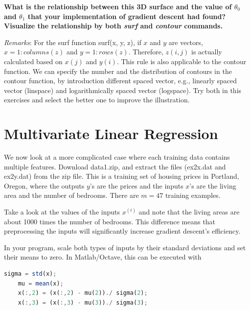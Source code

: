 \documentclass[10pt,a4paper]{article}
\begin{document}
  \textbf{What is the relationship between this 3D surface and the value of $\theta_0$ and $\theta_1$ that your implementation of gradient descent had found? Visualize the relationship by both \emph{surf} and \emph{contour} commands.}

  \vspace{2ex}
  \noindent\emph{Remarks}: For the \textsf{surf} function \textsf{surf(x, y, z)}, if $x$ and $y$ are vectors, $x = 1:columns(z)$ and $y=1:rows(z)$. Therefore, $z(i, j)$ is actually calculated based on $x(j)$ and $y(i)$. This rule is also applicable to the contour function. We can specify the number and the distribution of contours in the \textsf{contour} function, by introduction different spaced vector, e.g., linearly spaced vector (\textsf{linspace}) and logarithmically spaced vector (\textsf{logspace}). Try both in this exercises and select the better one to improve the illustration. 



\section{Multivariate Linear Regression}
%
  We now look at a more complicated case where each training data contains multiple features. Download data1.zip, and extract the files (ex2x.dat and ex2y.dat) from the zip file. This is a training set of housing prices in Portland, Oregon, where the outputs $y$'s are the prices and the inputs $x$'s are the living area and the number of bedrooms. There are $m=47$ training examples.

  Take a look at the values of the inputs $x^{(i)}$ and note that the living areas are about 1000 times the number of bedrooms. This difference means that preprocessing the inputs will significantly increase gradient descent's efficiency.

  In your program, scale both types of inputs by their standard deviations and set their means to zero. In Matlab/Octave, this can be executed with
  \begin{lstlisting}[language=Octave, basicstyle=\footnotesize, showspaces=false]
    sigma = std(x);
    mu = mean(x);
    x(:,2) = (x(:,2) - mu(2))./ sigma(2);
    x(:,3) = (x(:,3) - mu(3))./ sigma(3);
  \end{lstlisting}
\end{document}
